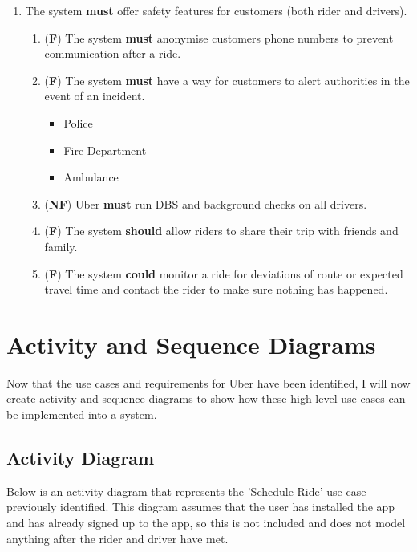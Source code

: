 \documentclass{article}
\begin{document}
\begin{enumerate}
      \newpage
      \item The system \textbf{must} offer safety features for customers (both rider and drivers).
      \begin{enumerate}[label=4.\arabic{*}]
        \item (\textbf{F}) The system \textbf{must} anonymise customers phone numbers to prevent communication after a ride.
        \item (\textbf{F}) The system \textbf{must} have a way for customers to alert authorities in the event of an incident.
        \begin{itemize}
          \item Police
          \item Fire Department
          \item Ambulance
        \end{itemize}
        \item (\textbf{NF}) Uber \textbf{must} run DBS and background checks on all drivers.
        \item (\textbf{F}) The system \textbf{should} allow riders to share their trip with friends and family.
        \item (\textbf{F}) The system \textbf{could} monitor a ride for deviations of route or expected travel time and contact the rider to make sure nothing has happened.
      \end{enumerate}
    \end{enumerate}

    \newpage
    \section{Activity and Sequence Diagrams}
    Now that the use cases and requirements for Uber have been identified, I will now create activity and sequence diagrams to show how these high
    level use cases can be implemented into a system. 
    
    \subsection{Activity Diagram}

    Below is an activity diagram that represents the 'Schedule Ride' use case previously identified.
    This diagram assumes that the user has installed the app and has already signed up to the app, so this is not included and does not model anything after the rider and driver have met.
\end{document}
